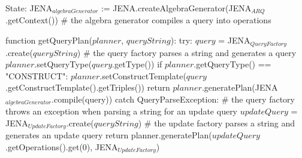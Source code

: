 State:
    JENA$_{algebraGenerator}$ := JENA.createAlgebraGenerator(JENA$_{ARQ}$.getContext()) # the algebra generator compiles a query into operations

function getQueryPlan($planner$, $queryString$):
    try: 
        $query$ = JENA$_{QueryFactory}$.create($queryString$) # the query factory parses a string and generates a query
        $planner$.setQueryType($query$.getType())
        if $planner$.getQueryType() == "CONSTRUCT":
            $planner$.setConstructTemplate($query$.getConstructTemplate().getTriples())
        return $planner$.generatePlan(JENA$_{algebraGenerator}$.compile(query))
    catch QueryParseException: # the query factory throws an exception when parsing a string for an update query                                                        
        $updateQuery$ = JENA$_{UpdateFactory}$.create($queryString$) # the update factory parses a string and generates an update query
        return planner.generatePlan($updateQuery$.getOperations().get(0), JENA$_{UpdateFactory}$)